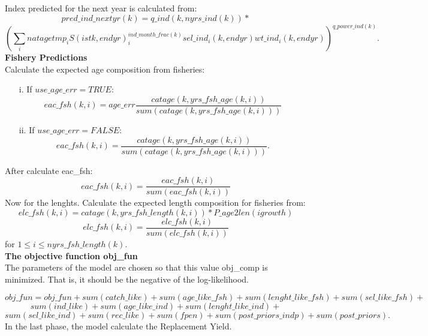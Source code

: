 \documentclass{article}
\begin{document}
Index predicted for the next year is calculated from:
\begin{equation}
    pred\_ind\_nextyr(k)=q\_ind(k,nyrs\_ind(k)) * 
\end{equation}
\begin{equation}
\left(\sum_inatagetmp_iS(istk,endyr)_i^{ind\_month\_frac(k)} sel\_ind_i(k,endyr)  wt\_ind_i(k,endyr)\right)^{q\_power\_ind(k)}.
\end{equation}
\textbf{Fishery Predictions}\\
Calculate the expected age composition from fisheries:
\begin{itemize}
    \item [i.] If $use\_age\_err=TRUE$:
    \begin{equation}
    eac\_fsh(k,i)=age\_err\dfrac{catage(k,yrs\_fsh\_age(k,i))}{sum(catage(k,yrs\_fsh\_age(k,i)))}
\end{equation}
\item [ii.] If $use\_age\_err=FALSE$:
\begin{equation}
    eac\_fsh(k,i)=\dfrac{catage(k,yrs\_fsh\_age(k,i))}{sum(catage(k,yrs\_fsh\_age(k,i)))}.
\end{equation}
\end{itemize}
After calculate eac\_fsh:
\begin{equation}
    eac\_fsh(k,i)=\dfrac{eac\_fsh(k,i)}{sum(eac\_fsh(k,i))}
\end{equation}
Now for the lenghts. Calculate the expected length composition for fisheries from: 
\begin{equation}
    elc\_fsh(k,i)=catage(k,yrs\_fsh\_length(k,i))*P\_age2len(igrowth)
\end{equation}
\begin{equation}
    elc\_fsh(k,i)=\dfrac{elc\_fsh(k,i)}{sum(elc\_fsh(k,i))}
\end{equation}
for $1\leq i \leq nyrs\_fsh\_length(k)$.\\

\textbf{The objective function obj\_fun}\\

The parameters of the model are chosen so that this value obj\_comp is minimized. That is, it should be the negative of the log-likelihood.

\begin{equation}
    obj\_fun=obj\_fun+sum(catch\_like)+sum(age\_like\_fsh)+sum(lenght\_like\_fsh)+sum(sel\_like\_fsh)+
\end{equation}
\begin{equation*}
    sum(ind\_like)+sum(age\_like\_ind)+sum(lenght\_like\_ind)+
\end{equation*}
\begin{equation*}
    sum(sel\_like\_ind)+sum(rec\_like)+sum(fpen)+sum(post\_priors\_indp)+sum(post\_priors).
\end{equation*}
In the last phase, the model calculate the Replacement Yield.\\
\end{document}
